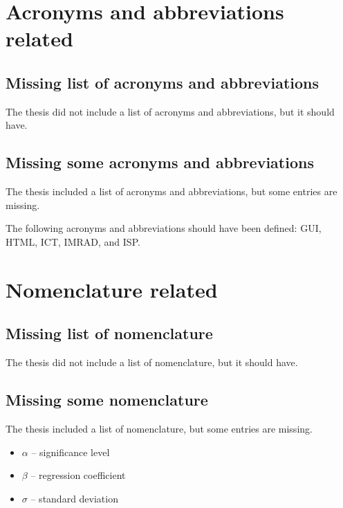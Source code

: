 \documentclass[
English,                 %
biblatex,             %
]{kththesis}
\begin{document}
\section*{Acronyms and abbreviations related}
\subsection*{Missing list of acronyms and abbreviations}
The thesis did not include a list of acronyms and abbreviations, but it should have.


\subsection*{Missing some acronyms and abbreviations}
The thesis included a list of acronyms and abbreviations, but some entries are missing.

The following acronyms and abbreviations should have been defined:
\gls{GUI},
\gls{HTML},
\gls{ICT},
\gls{IMRAD}, and
\gls{ISP}.

\printglossary[style=mylong, type=\acronymtype, title={List of Acronyms and abbreviations}]

\clearpage

\section*{Nomenclature related}

\subsection*{Missing list of nomenclature}
The thesis did not include a list of nomenclature, but it should have.

\subsection*{Missing some nomenclature}
The thesis included a list of nomenclature, but some entries are missing.
\begin{itemize}
\item $\alpha$ -- significance level
\item $\beta$ -- regression coefficient
\item $\sigma$ -- standard deviation
\end{itemize}
\end{document}
